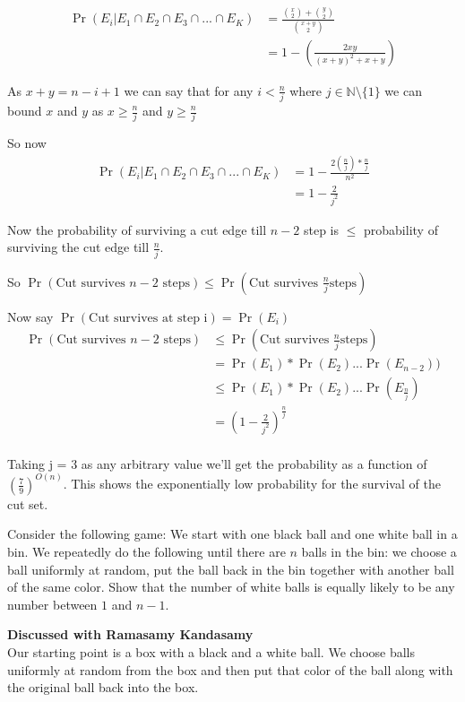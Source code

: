 \documentclass[addpoints,12pt]{exam}
\begin{document}
\begin{questions}
\begin{solution}
                \begin{align*}
                    \Pr(E_i | E_1 \cap E_2 \cap E_3 \cap ... \cap E_K) &= \frac{\binom{x}{2} + \binom{y}{2}}{\binom{x+y}{2}}\\
                    &= 1 - \left(\frac{2xy}{(x+y)^2 + x + y}\right)
                \end{align*}

                As $x + y = n - i + 1$ we can say that for any $i < \frac{n}{j}$ where $j \in \mathbb{N} \setminus \{1\}$ we can bound $x$ and $y$ as $x \geq \frac{n}{j}$ and $y \geq \frac{n}{j}$

                So now 
                \begin{align*}
                    \Pr(E_i | E_1 \cap E_2 \cap E_3 \cap ... \cap E_K) &= 1 - \frac{2 (\frac{n}{j}) * \frac{n}{j}}{n^2}\\
                    &= 1 - \frac{2}{j^2}
                \end{align*}

                Now the probability of surviving a cut edge till $n-2$ step is $\leq$ probability of surviving the cut edge till $\frac{n}{j}$.

                So $\Pr(\text{Cut survives } n - 2 \text{ steps}) \leq \Pr(\text{Cut survives } \frac{n}{j} \text{steps})$

                Now say $\Pr(\text{Cut survives at step i}) = \Pr(E_i)$
                \begin{align*}
                    \Pr(\text{Cut survives } n - 2 \text{ steps}) &\leq \Pr(\text{Cut survives } \frac{n}{j} \text{steps})\\
                    &= \Pr(E_1) * \Pr(E_2) ... \Pr(E_{n -2}))\\
                    &\leq \Pr(E_1) * \Pr(E_2) ... \Pr(E_{\frac{n}{j}})\\
                    &= (1 - \frac{2}{j^2})^{\frac{n}{j}}\\
                \end{align*}

                Taking j = 3 as any arbitrary value we'll get the probability as a function of $(\frac{7}{9})^{O(n)}$. This shows the exponentially low probability for the survival of the cut set.
		\end{solution}
		
		\question[5] Consider the following game: We start with one black ball and one white ball in a bin. We repeatedly do the following until there are $n$ balls in the bin: we choose a ball uniformly at random, put the ball back in the bin together with another ball of the same color. Show that the number of white balls is equally likely to be any number between $1$ and $n-1$.
		\begin{solution} \textbf{Discussed with Ramasamy Kandasamy}\\
			Our starting point is a box with a black and a white ball. We choose balls uniformly at random from the box and then put that color of the ball along with the original ball back into the box.


\end{solution}
\end{questions}
\end{document}
